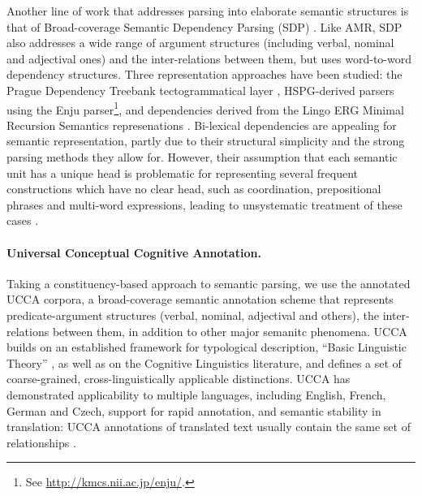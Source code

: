 \documentclass[11pt]{article}
\begin{document}
Another line of work that addresses parsing into elaborate semantic structures
is that of Broad-coverage Semantic Dependency Parsing (SDP) \cite{oepen2014semeval,oepen2015semeval}.
Like AMR, SDP also addresses a wide range of argument structures (including verbal, nominal and
adjectival ones) and the inter-relations between them, but uses word-to-word dependency structures.
Three representation approaches have been studied:
the Prague Dependency Treebank tectogrammatical layer \cite{bohmova2003prague},
HSPG-derived parsers using the Enju parser\footnote{See \url{http://kmcs.nii.ac.jp/enju/}.},
and dependencies derived from the Lingo ERG Minimal Recursion Semantics represenations \cite{Flic:02}.
Bi-lexical dependencies are appealing for semantic representation, partly due to
their structural simplicity and the strong parsing methods they allow for.
However, their assumption that each semantic unit has a unique head is
problematic for representing several frequent constructions which have no clear
head, such as coordination, prepositional phrases and multi-word expressions,
leading to unsystematic treatment of these cases \cite{schwartz2011neutralizing,Ivanova2012who,tsarfaty2012cross}.

\paragraph{Universal Conceptual Cognitive Annotation.}\label{subsec:ucca}
Taking a constituency-based approach to semantic parsing,
we use the annotated UCCA corpora, a broad-coverage semantic annotation scheme that
represents predicate-argument structures (verbal, nominal, adjectival and others),
the inter-relations between them, in addition to other major semanitc phenomena.
UCCA builds on an established framework
for typological description, ``Basic Linguistic Theory''
\cite{Dixon:10b,Dixon:10a,Dixon:12}, as well as on the Cognitive Linguistics literature,
and defines a set of coarse-grained, cross-linguistically applicable distinctions.
UCCA has demonstrated applicability to multiple languages, including English, French, German and
Czech, support for rapid annotation, and semantic stability in translation: UCCA
annotations of translated text usually contain the same set of relationships
\cite{sulem2015conceptual}.
\end{document}
